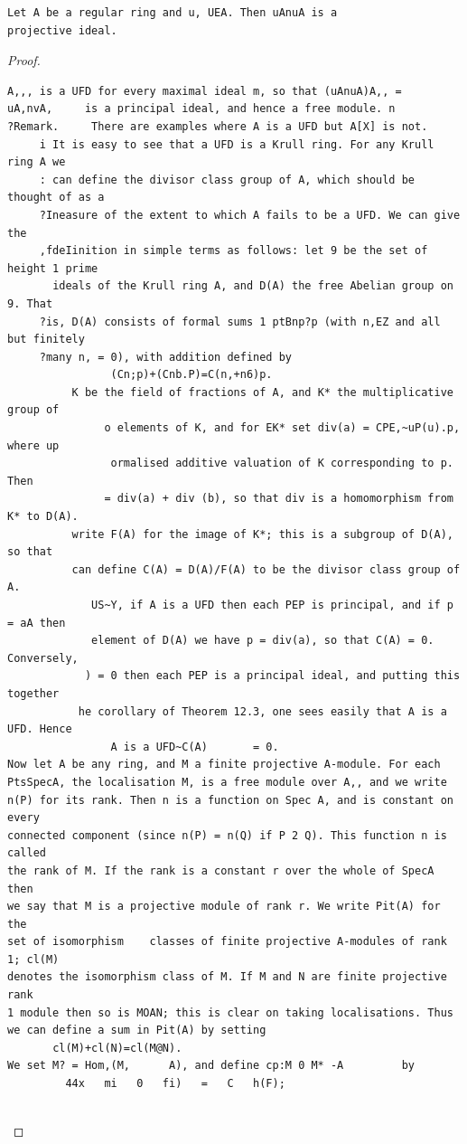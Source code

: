 \begin{theorem}\label{mcrt-auto-theorem-20-6}\uses{}
\begin{verbatim}
Let A be a regular ring and u, UEA. Then uAnuA is a
projective ideal.
\end{verbatim}
\end{theorem}
\begin{proof}
\begin{verbatim}
A,,, is a UFD for every maximal ideal m, so that (uAnuA)A,, =
uA,nvA,     is a principal ideal, and hence a free module. n
?Remark.     There are examples where A is a UFD but A[X] is not.
     i It is easy to see that a UFD is a Krull ring. For any Krull ring A we
     : can define the divisor class group of A, which should be thought of as a
     ?Ineasure of the extent to which A fails to be a UFD. We can give the
     ,fdeIinition in simple terms as follows: let 9 be the set of height 1 prime
       ideals of the Krull ring A, and D(A) the free Abelian group on 9. That
     ?is, D(A) consists of formal sums 1 ptBnp?p (with n,EZ and all but finitely
     ?many n, = 0), with addition defined by
                (Cn;p)+(Cnb.P)=C(n,+n6)p.
          K be the field of fractions of A, and K* the multiplicative   group of
               o elements of K, and for EK* set div(a) = CPE,~uP(u).p, where up
                ormalised additive valuation of K corresponding to p. Then
               = div(a) + div (b), so that div is a homomorphism from K* to D(A).
          write F(A) for the image of K*; this is a subgroup of D(A), so that
          can define C(A) = D(A)/F(A) to be the divisor class group of A.
             US~Y, if A is a UFD then each PEP is principal, and if p = aA then
             element of D(A) we have p = div(a), so that C(A) = 0. Conversely,
            ) = 0 then each PEP is a principal ideal, and putting this together
           he corollary of Theorem 12.3, one sees easily that A is a UFD. Hence
                A is a UFD~C(A)       = 0.
Now let A be any ring, and M a finite projective A-module. For each
PtsSpecA, the localisation M, is a free module over A,, and we write
n(P) for its rank. Then n is a function on Spec A, and is constant on every
connected component (since n(P) = n(Q) if P 2 Q). This function n is called
the rank of M. If the rank is a constant r over the whole of SpecA then
we say that M is a projective module of rank r. We write Pit(A) for the
set of isomorphism    classes of finite projective A-modules of rank 1; cl(M)
denotes the isomorphism class of M. If M and N are finite projective rank
1 module then so is MOAN; this is clear on taking localisations. Thus
we can define a sum in Pit(A) by setting
       cl(M)+cl(N)=cl(M@N).
We set M? = Hom,(M,      A), and define cp:M 0 M* -A         by
         44x   mi   0   fi)   =   C   h(F);


\end{verbatim}
\end{proof}
